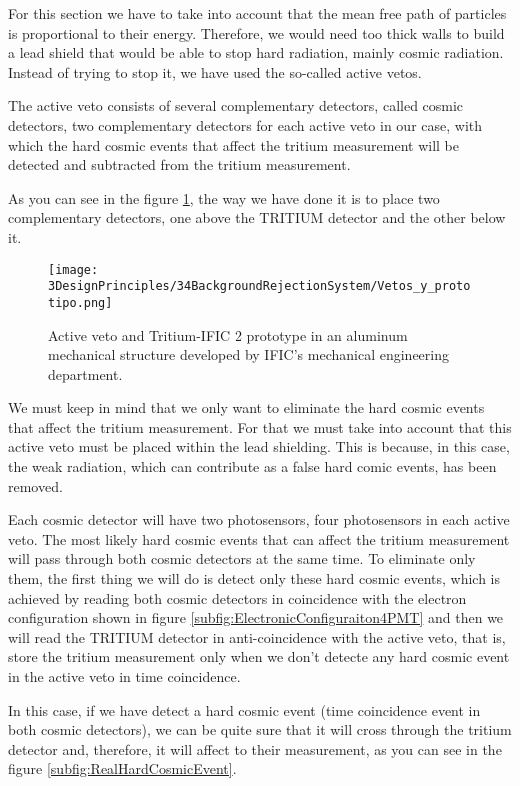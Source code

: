 For this section we have to take into account that the mean free path of particles is proportional to their energy. Therefore, we would need too thick walls to build a lead shield that would be able to stop hard radiation, mainly cosmic radiation. Instead of trying to stop it, we have used the so-called active vetos.

The active veto consists of several complementary detectors, called cosmic detectors, two complementary detectors for each active veto in our case, with which the hard cosmic events that affect the tritium measurement will be detected and subtracted from the tritium measurement.

As you can see in the figure \ref{fig:VetoAndPrototype}, the way we have done it is to place two complementary detectors, one above the TRITIUM detector and the other below it. 

\begin{figure}[h]
\centering
\texttt{[image: 3DesignPrinciples/34BackgroundRejectionSystem/Vetos\_y\_prototipo.png]}
\caption{Active veto and Tritium-IFIC 2 prototype in an aluminum mechanical structure developed by IFIC's mechanical engineering department.\label{fig:VetoAndPrototype}}
\end{figure}

We must keep in mind that we only want to eliminate the hard cosmic events that affect the tritium measurement. For that we must take into account that this active veto must be placed within the lead shielding. This is because, in this case, the weak radiation, which can contribute as a false hard comic events, has been removed.

Each cosmic detector will have two photosensors, four photosensors in each active veto. The most likely hard cosmic events that can affect the tritium measurement will pass through both cosmic detectors at the same time. To eliminate only them, the first thing we will do is detect only these hard cosmic events, which is achieved by reading both cosmic detectors in coincidence with the electron configuration shown in figure \ref{subfig:ElectronicConfiguraiton4PMT} and then we will read the TRITIUM detector in anti-coincidence with the active veto, that is, store the tritium measurement only when we don't detecte any hard cosmic event in the active veto in time coincidence. 

In this case, if we have detect a hard cosmic event (time coincidence event in both cosmic detectors), we can be quite sure that it will cross through the tritium detector and, therefore, it will affect to their measurement, as you can see in the figure \ref{subfig:RealHardCosmicEvent}.

